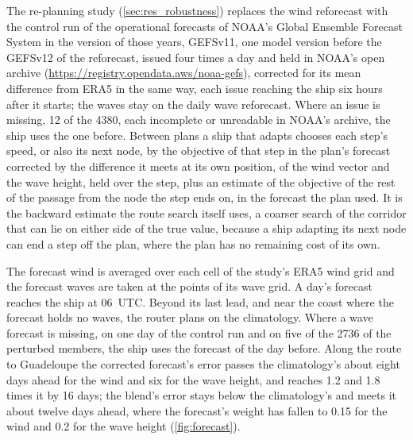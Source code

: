The re-planning study (\cref{sec:res_robustness}) replaces the wind reforecast with the control run of the operational forecasts of NOAA's Global Ensemble Forecast System in the version of those years, GEFSv11, one model version before the GEFSv12 of the reforecast, issued four times a day and held in NOAA's open archive (\url{https://registry.opendata.aws/noaa-gefs}), corrected for its mean difference from ERA5 in the same way, each issue reaching the ship six hours after it starts; the waves stay on the daily wave reforecast. Where an issue is missing, 12 of the 4380, each incomplete or unreadable in NOAA's archive, the ship uses the one before. Between plans a ship that adapts chooses each step's speed, or also its next node, by the objective of that step in the plan's forecast corrected by the difference it meets at its own position, of the wind vector and the wave height, held over the step, plus an estimate of the objective of the rest of the passage from the node the step ends on, in the forecast the plan used. It is the backward estimate the route search itself uses, a coarser search of the corridor that can lie on either side of the true value, because a ship adapting its next node can end a step off the plan, where the plan has no remaining cost of its own.

The forecast wind is averaged over each cell of the study's ERA5 wind grid and the forecast waves are taken at the points of its wave grid. A day's forecast reaches the ship at 06~UTC. Beyond its last lead, and near the coast where the forecast holds no waves, the router plans on the climatology. Where a wave forecast is missing, on one day of the control run and on five of the 2736 of the perturbed members, the ship uses the forecast of the day before. Along the route to Guadeloupe the corrected forecast's error passes the climatology's about eight days ahead for the wind and six for the wave height, and reaches 1.2 and 1.8 times it by 16 days; the blend's error stays below the climatology's and meets it about twelve days ahead, where the forecast's weight has fallen to 0.15 for the wind and 0.2 for the wave height (\cref{fig:forecast}). 

